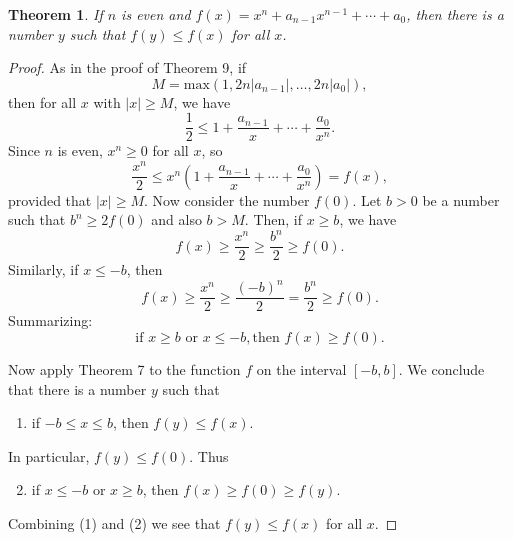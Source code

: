 \documentclass{article}
\newtheorem{theorem}{Theorem}
\begin{document}
\begin{theorem}
  If $n$ is even and $f(x) = x^n + a_{n-1}x^{n-1} + \cdots + a_0$, then there
  is a number $y$ such that $f(y) \leq f(x)$ for all $x$.
\end{theorem}

\begin{proof}
  As in the proof of Theorem 9, if \begin{equation*}
    M = \mathrm{max}(1, 2n|a_{n-1}|, \ldots, 2n|a_0|),
  \end{equation*}
  then for all $x$ with $|x| \geq M$, we have \begin{equation*}
    \frac{1}{2} \leq 1 + \frac{a_{n-1}}{x} + \cdots + \frac{a_0}{x^n}.
  \end{equation*}
  Since $n$ is even, $x^n \geq 0$ for all $x$, so \begin{equation*}
    \frac{x^n}{2} \leq x^n\left(1 + \frac{a_{n-1}}{x} + \cdots +
      \frac{a_0}{x^n}\right) = f(x),
  \end{equation*}
  provided that $|x| \geq M$. Now consider the number $f(0)$. Let $b > 0$ be a
  number such that $b^n \geq 2f(0)$ and also $b > M$. Then, if $x \geq b$, we
  have \begin{equation*}
    f(x) \geq \frac{x^n}{2} \geq \frac{b^n}{2} \geq f(0).
  \end{equation*}
  Similarly, if $x \leq -b$, then \begin{equation*}
    f(x) \geq \frac{x^n}{2} \geq \frac{(-b)^n}{2} = \frac{b^n}{2} \geq f(0).
  \end{equation*}
  Summarizing: \begin{equation*}
    \text{if } x \geq b \text{ or } x \leq -b, \text{then } f(x) \geq f(0).
  \end{equation*}

  Now apply Theorem 7 to the function $f$ on the interval $[-b, b]$. We
  conclude that there is a number $y$ such that \begin{enumerate}
    \item if $-b \leq x \leq b$, then $f(y) \leq f(x)$.
  \end{enumerate}
  In particular, $f(y) \leq f(0)$. Thus \begin{enumerate}
    \setcounter{enumi}{1}
    \item if $x \leq -b$ or $x \geq b$, then $f(x) \geq f(0) \geq f(y)$.
  \end{enumerate}
  Combining (1) and (2) we see that $f(y) \leq f(x)$ for all $x$.
\end{proof}
\end{document}
